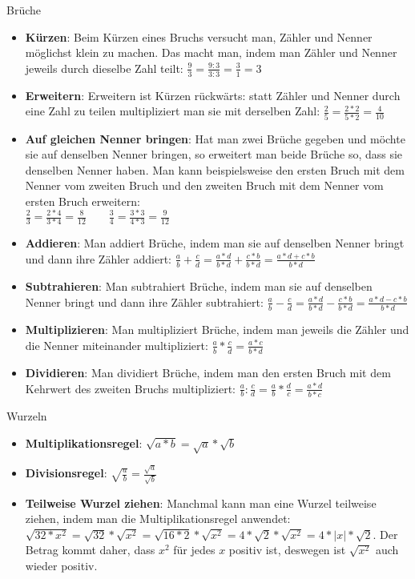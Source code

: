\begin{bla}{Brüche}
  \begin{itemize}
    \item \textbf{Kürzen}: Beim Kürzen eines Bruchs versucht man, Zähler und Nenner möglichst klein zu machen. Das macht man, indem man Zähler und Nenner jeweils durch dieselbe Zahl teilt: $ \frac{9}{3}=\frac{9:3}{3:3}=\frac{3}{1}=3$
    \item \textbf{Erweitern}: Erweitern ist Kürzen rückwärts: statt Zähler und Nenner durch eine Zahl zu teilen multipliziert man sie mit derselben Zahl: $\frac{2}{5}=\frac{2*2}{5*2}=\frac{4}{10}$
    \item \textbf{Auf gleichen Nenner bringen}: Hat man zwei Brüche gegeben und möchte sie auf denselben Nenner bringen, so erweitert man beide Brüche so, dass sie denselben Nenner haben. Man kann beispielsweise den ersten Bruch mit dem Nenner vom zweiten Bruch und den zweiten Bruch mit dem Nenner vom ersten Bruch erweitern: \\ $\frac{2}{3}=\frac{2*4}{3*4}=\frac{8}{12} \qquad \frac{3}{4}=\frac{3*3}{4*3}=\frac{9}{12}$
    \item \textbf{Addieren}: Man addiert Brüche, indem man sie auf denselben Nenner bringt und dann ihre Zähler addiert: $\frac{a}{b}+\frac{c}{d} = \frac{a*d}{b*d}+\frac{c*b}{b*d} = \frac{a*d+c*b}{b*d}$
    \item \textbf{Subtrahieren}: Man subtrahiert Brüche, indem man sie auf denselben Nenner bringt und dann ihre Zähler subtrahiert: $\frac{a}{b}-\frac{c}{d} = \frac{a*d}{b*d}-\frac{c*b}{b*d} = \frac{a*d-c*b}{b*d}$
    \item \textbf{Multiplizieren}: Man multipliziert Brüche, indem man jeweils die Zähler und die Nenner miteinander multipliziert: $\frac{a}{b}*\frac{c}{d}=\frac{a*c}{b*d}$
    \item \textbf{Dividieren}: Man dividiert Brüche, indem man den ersten Bruch mit dem Kehrwert des zweiten Bruchs multipliziert: $\frac{a}{b}:\frac{c}{d}=\frac{a}{b}*\frac{d}{c}=\frac{a*d}{b*c}$
  \end{itemize}
\end{bla}

\begin{bla}{Wurzeln}
  \begin{itemize}
    \item \textbf{Multiplikationsregel}: $\sqrt{a*b}=\sqrt{a}*\sqrt{b}$
    \item \textbf{Divisionsregel}: $\sqrt{\frac{a}{b}}=\frac{\sqrt{a}}{\sqrt{b}}$
    \item \textbf{Teilweise Wurzel ziehen}: Manchmal kann man eine Wurzel teilweise ziehen, indem man die Multiplikationsregel anwendet: $\sqrt{32*x^2}=\sqrt{32}*\sqrt{x^2}=\sqrt{16*2}*\sqrt{x^2}=4*\sqrt{2}*\sqrt{x^2}=4*|x|*\sqrt{2}$. Der Betrag kommt daher, dass $x^2$ für jedes $x$ positiv ist, deswegen ist $\sqrt{x^2}$ auch wieder positiv.
  \end{itemize}
\end{bla}

